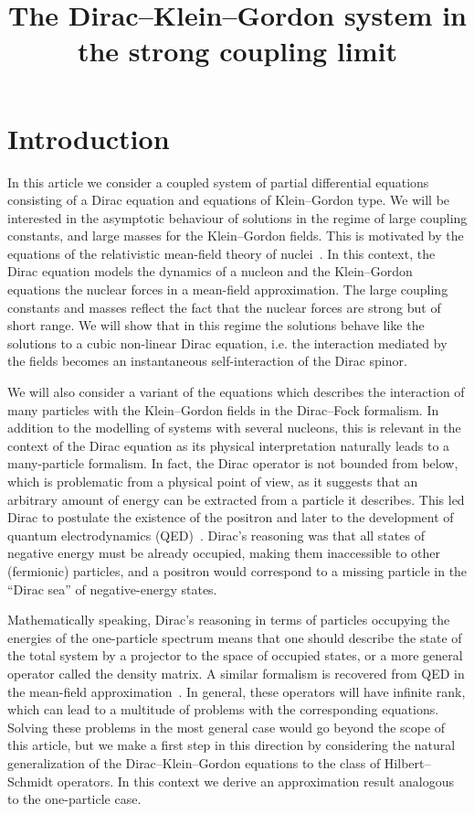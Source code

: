 \documentclass[AHL,Unicode,longabstracts,published]{cedram}
\title{The Dirac--Klein--Gordon system in the strong coupling limit}
\author[\initial{J.} \lastname{Lampart}]{\firstname{Jonas} \lastname{Lampart}}
\author[\initial{L.} \lastname{Le Treust}]{\firstname{Lo{\"\i}c} \lastname{Le Treust}}
\author[\initial{S.} \lastname{Rota Nodari}]{\firstname{Simona} \lastname{Rota Nodari}}
\author[\initial{J.} \lastname{Sabin}]{\firstname{Julien} \lastname{Sabin}}
\begin{document}
\maketitle

\section{Introduction}

In this article we consider a coupled system of partial differential equations consisting of a Dirac equation and equations of Klein--Gordon type. We will be interested in the asymptotic behaviour of solutions in the regime of large coupling constants, and large masses for the Klein--Gordon fields. This is motivated by the equations of the relativistic mean-field theory of nuclei~\cite{Ring-96}. In this context, the Dirac equation models the dynamics of a nucleon and the Klein--Gordon equations the nuclear forces in a mean-field approximation. The large coupling constants and masses reflect the fact that the nuclear forces are strong but of short range. We will show that in this regime the solutions behave like the solutions to a cubic non-linear Dirac equation, i.e. the interaction mediated by the fields becomes an instantaneous self-interaction of the Dirac spinor.

We will also consider a variant of the equations which describes the interaction of many particles with the Klein--Gordon fields in the Dirac--Fock formalism. In addition to the modelling of systems with several nucleons, this is relevant in the context of the Dirac equation as its physical interpretation naturally leads to a many-particle formalism. In fact, the Dirac operator is not bounded from below, which is problematic from a physical point of view, as it suggests that an arbitrary amount of energy can be extracted from a particle it describes. This led Dirac to postulate the existence of the positron and later to the development of quantum electrodynamics (QED)~\cite{dirac1928quantum,dirac1928quantumII}. Dirac's reasoning was that all states of negative energy must be already occupied, making them inaccessible to other (fermionic) particles, and a positron would correspond to a missing particle in the ``Dirac sea'' of negative-energy states.

Mathematically speaking, Dirac's reasoning in terms of particles occupying the energies of the one-particle spectrum means that one should describe the state of the total system by a projector to the space of occupied states, or a more general operator called the density matrix. A similar formalism is recovered from QED in the mean-field approximation~\cite{chaix1989}. In general, these operators will have infinite rank, which can lead to a multitude of problems with the corresponding equations. Solving these problems in the most general case would go beyond the scope of this article, but we make a first step in this direction by considering the natural generalization of the Dirac--Klein--Gordon equations to the class of Hilbert--Schmidt operators. In this context we derive an approximation result analogous to the one-particle case.
\end{document}
